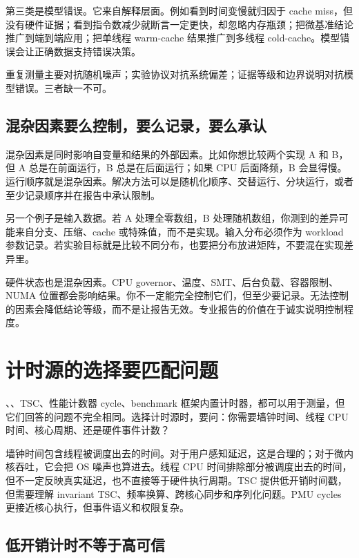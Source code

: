第三类是模型错误。它来自解释层面。例如看到时间变慢就归因于 cache miss，但没有硬件证据；看到指令数减少就断言一定更快，却忽略内存瓶颈；把微基准结论推广到端到端应用；把单线程 warm-cache 结果推广到多线程 cold-cache。模型错误会让正确数据支持错误决策。

\begin{mentalmodel}
重复测量主要对抗随机噪声；实验协议对抗系统偏差；证据等级和边界说明对抗模型错误。三者缺一不可。
\end{mentalmodel}

\subsection{混杂因素要么控制，要么记录，要么承认}

混杂因素是同时影响自变量和结果的外部因素。比如你想比较两个实现 A 和 B，但 A 总是在前面运行，B 总是在后面运行；如果 CPU 后面降频，B 会显得慢。运行顺序就是混杂因素。解决方法可以是随机化顺序、交替运行、分块运行，或者至少记录顺序并在报告中承认限制。

另一个例子是输入数据。若 A 处理全零数组，B 处理随机数组，你测到的差异可能来自分支、压缩、cache 或特殊值，而不是实现。输入分布必须作为 workload 参数记录。若实验目标就是比较不同分布，也要把分布放进矩阵，不要混在实现差异里。

硬件状态也是混杂因素。CPU governor、温度、SMT、后台负载、容器限制、NUMA 位置都会影响结果。你不一定能完全控制它们，但至少要记录。无法控制的因素会降低结论等级，而不是让报告无效。专业报告的价值在于诚实说明控制程度。

\section{计时源的选择要匹配问题}

、、TSC、性能计数器 cycle、benchmark 框架内置计时器，都可以用于测量，但它们回答的问题不完全相同。选择计时源时，要问：你需要墙钟时间、线程 CPU 时间、核心周期、还是硬件事件计数？

墙钟时间包含线程被调度出去的时间。对于用户感知延迟，这是合理的；对于微内核吞吐，它会把 OS 噪声也算进去。线程 CPU 时间排除部分被调度出去的时间，但不一定反映真实延迟，也不直接等于硬件执行周期。TSC 提供低开销时间戳，但需要理解 invariant TSC、频率换算、跨核心同步和序列化问题。PMU cycles 更接近核心执行，但事件语义和权限复杂。

\subsection{低开销计时不等于高可信}

